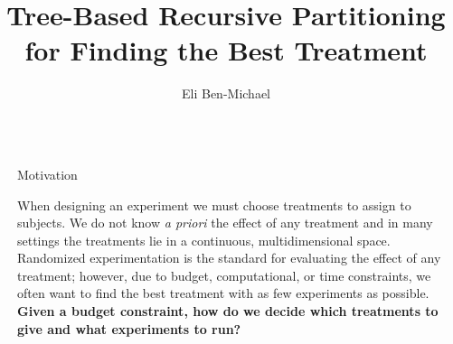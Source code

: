 \documentclass[final]{beamer}
\title{Tree-Based Recursive Partitioning for Finding the Best Treatment} %
\author{Eli Ben-Michael} %
\institute{Department of Statistics, UC Berkeley} %
\newlength{\sepwid}
\newlength{\onecolwid}
\begin{document}

\setlength{\belowcaptionskip}{2ex} %
\setlength\belowdisplayshortskip{2ex} %

\begin{frame}[t] %



\begin{columns}[t] %

\begin{column}{\sepwid}\end{column} %

\begin{column}{\onecolwid} %





\begin{block}{Motivation}

When designing an experiment we must choose treatments to assign to subjects. 
We do not know {\it a priori} the effect of any treatment and in many settings the treatments lie in a continuous, multidimensional space. Randomized experimentation is the standard for evaluating the effect of any treatment; however, due to budget, computational, or time constraints, we often want to find the best treatment with as few experiments as possible. {\bf Given a budget constraint, how do we decide which treatments to give and what experiments to run?}


\end{block}
\end{column}
\end{columns}
\end{frame}
\end{document}
